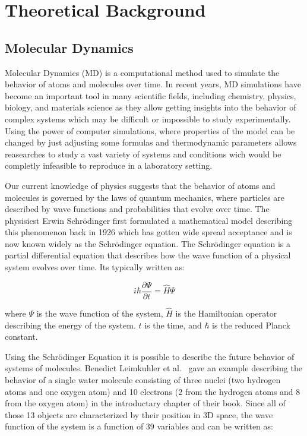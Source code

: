 \chapter{Theoretical Background}
\label{sec:theoretical_background}


\section{Molecular Dynamics}

Molecular Dynamics (MD) is a computational method used to simulate the behavior of atoms and molecules over time. In recent years, MD simulations have become an important tool in many scientific fields, including chemistry, physics, biology, and materials science as they allow getting insights into the behavior of complex systems which may be difficult or impossible to study experimentally. Using the power of computer simulations, where properties of the model can be changed by just adjusting some formulas and thermodynamic parameters allows reasearches to study a vast variety of systems and conditions wich would be completly infeasible to reproduce in a laboratory setting.


Our current knowledge of physics suggests that the behavior of atoms and molecules is governed by the laws of quantum mechanics, where particles are described by wave functions and probabilities that evolve over time. The physisicst Erwin Schrödinger first formulated a mathematical model describing this phenomenon back in 1926  which has gotten wide spread acceptance and is now known widely as the Schrödinger equation. The Schrödinger equation is a partial differential equation that describes how the wave function of a physical system evolves over time. Its typically written as:

\begin{equation}
      i \hbar \frac{\partial \Psi}{\partial t} = \hat{H} \Psi
\end{equation}

where $\Psi$ is the wave function of the system, $\hat{H}$ is the Hamiltonian operator describing the energy of the system. $t$ is the time, and $\hbar$ is the reduced Planck constant.

Using the Schrödinger Equation it is possible to describe the future behavior of systems of molecules. Benedict Leimkuhler et al.~\cite{Leimkuhler2015} gave an example describing the behavior of a single water molecule consisting of three nuclei (two hydrogen atoms and one oxygen atom) and 10 electrons (2 from the hydrogen atoms and 8 from the oxygen atom) in the introductary chapter of their book. Since all of those 13 objects are characterized by their position in 3D space, the wave function of the system is a function of 39 variables and can be written as:

